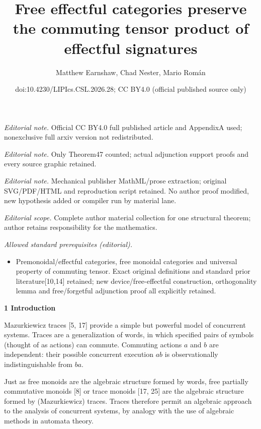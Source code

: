 \documentclass[10pt,a4paper]{article}
\title{Free effectful categories preserve the commuting tensor product of effectful signatures}
\author{Matthew Earnshaw, Chad Nester, Mario Román}
\date{doi:10.4230/LIPIcs.CSL.2026.28; CC BY4.0 (official published source only)}
\begin{document}
\maketitle
\noindent\textit{Editorial note.} Official CC BY4.0 full published article and AppendixA used; nonexclusive full arxiv version not redistributed.\par\medskip
\noindent\textit{Editorial note.} Only Theorem47 counted; actual adjunction support proofs and every source graphic retained.\par\medskip
\noindent\textit{Editorial note.} Mechanical publisher MathML/prose extraction; original SVG/PDF/HTML and reproduction script retained. No author proof modified, new hypothesis added or compiler run by material lane.\par\medskip
\noindent\textit{Editorial scope.} Complete author material collection for one structural theorem; author retains responsibility for the mathematics.\par\medskip
\noindent\textit{Allowed standard prerequisites (editorial).}\begin{itemize}
\item Premonoidal/effectful categories, free monoidal categories and universal property of commuting tensor. Exact original definitions and standard prior literature[10,14] retained; new device/free-effectful construction, orthogonality lemma and free/forgetful adjunction proof all explicitly retained.
\end{itemize}\medskip

 
\par\medskip\noindent\textbf{1 Introduction}\par
 
 
Mazurkiewicz traces [5, 17] provide a simple but powerful model of concurrent systems. Traces are a generalization of words, in which specified pairs of symbols (thought of as actions) can commute. Commuting actions $a$ and $b$ are independent: their possible concurrent execution $ab$ is observationally indistinguishable from $ba$.\par
 
 
 
Just as free monoids are the algebraic structure formed by words, free partially commutative monoids [8] or trace monoids [17, 25] are the algebraic structure formed by (Mazurkiewicz) traces. Traces therefore permit an algebraic approach to the analysis of concurrent systems, by analogy with the use of algebraic methods in automata theory.\par
 
\end{document}
